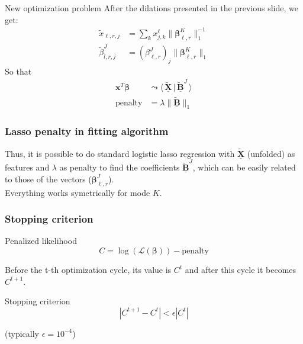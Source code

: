 \documentclass{beamer}
\begin{document}
\begin{frame}
    \begin{block}{New optimization problem}
        After the dilations presented in the previous slide, we get:
        \begin{align}
        \tilde{x}_{\ell,r,j} &= \sum\limits_{k}x_{j,k}^\ell\lVert \bm{\beta}_{\ell,r}^K\rVert_1^{-1}\\
        \tilde{\beta}_{l,r,j}^J &= 
        (\beta_{\ell,r}^J)_j\lVert \bm{\beta}_{\ell,r}^K \rVert_1 
        \end{align}
        \phantom{a}\hspace{40 pt}So that\\[-20 pt]
        \begin{align}
        \mathbf{x}^T\bm{\beta} & \leadsto  \langle \, \tilde{\underline{\mathbf{X}}}\,|\, \tilde{\underline{\mathbf{B}}}^J \,\rangle \\
        \text{penalty} &= \lambda \lVert \tilde{\underline{\mathbf{B}}}\rVert_1
        \end{align}
    \end{block}
    \frametitle{Lasso penalty in fitting algorithm}
    \noindent Thus, it is possible to do standard logistic lasso regression with $\tilde{\underline{\mathbf{X}}}$ (unfolded) as features and $\lambda$ as penalty to find the coefficients $\tilde{\underline{\mathbf{B}}}^J$, which can be easily related to those of the vectors ($\bm{\beta}_{\ell,r}^J$).\\[5 pt]
    Everything works symetrically for mode $K$.
\end{frame}

\begin{frame}
    \frametitle{Stopping criterion}
    \begin{block}{Penalized likelihood}
    $$C=  \log(\mathcal{L}(\bm{\beta})) -\text{penalty}$$
    \end{block}
    Before the t-th optimization cycle, its value is $C^{t}$ and after this cycle it becomes $C^{t + 1}$.\\[5 pt]
    \begin{block}{Stopping criterion}
    $$ |C^{t + 1} - C^t| < \epsilon |C^t|$$
    \end{block}
    (typically $\epsilon = 10^{-4}$)
\end{frame}
\end{document}
